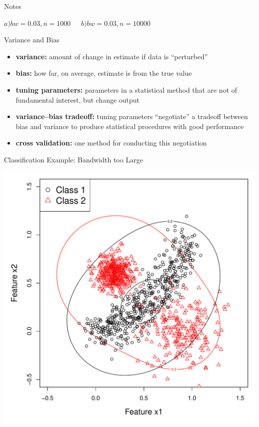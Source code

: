 \documentclass[12pt]{beamer}
\begin{document}
\begin{frame}{Notes}
\begin{itemize}
\begin{center}
      $a) bw=0.03, n = 1000 \, \, \, \, \,  \, \, \, \, b) bw=0.03, n=10000$
    \end{center}
  \end{itemize}
\end{frame}

\begin{frame}{Variance and Bias}
  \begin{itemize}
  \item \textbf{variance:} amount of change in estimate if data is ``perturbed''
  \item \textbf{bias:} how far, on average, estimate is from the true value
  \item \textbf{tuning parameters:} parameters in a statistical method that are not of fundamental interest, but change output
  \item \textbf{variance--bias tradeoff:} tuning parameters ``negotiate'' a tradeoff between bias and variance to produce statistical procedures with good performance
  \item \textbf{cross validation:} one method for conducting this negotiation
  \end{itemize}

\end{frame}



\begin{frame}{Classification Example: Bandwidth too Large}

  \begin{center}
    \includegraphics[scale=0.4]{figs/kde2d3.pdf}
  \end{center}
  
\end{frame}
\end{document}
